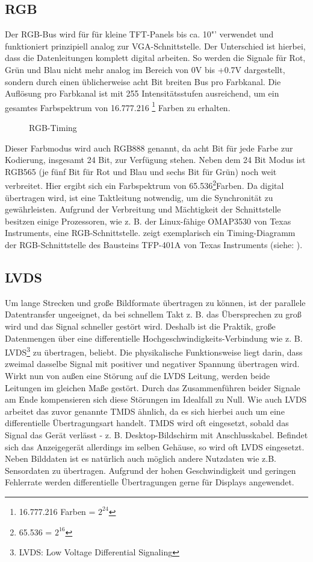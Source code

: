 \subsection{RGB}
Der RGB-Bus wird für für kleine TFT-Panels bis ca. 10"' verwendet und funktioniert prinzipiell analog zur VGA-Schnittstelle. Der Unterschied ist hierbei, dass die Datenleitungen komplett digital arbeiten. So werden die Signale für Rot, Grün und Blau nicht mehr analog im Bereich von 0V bis +0.7V dargestellt, sondern durch einen üblicherweise acht Bit breiten Bus pro Farbkanal. Die Auflösung pro Farbkanal ist mit 255 Intensitätsstufen ausreichend, um ein gesamtes Farbspektrum von 16.777.216 \footnote{16.777.216 Farben = $2^{24}$} Farben zu erhalten. 
\begin{figure}[htp]
	\centering
{}
	\caption{RGB-Timing}
	\label{fig:rgb_timing}
\end{figure}
Dieser Farbmodus wird auch RGB888 genannt, da acht Bit für jede Farbe zur Kodierung, insgesamt 24 Bit, zur Verfügung stehen. Neben dem 24 Bit Modus ist RGB565 (je fünf Bit für Rot und Blau und sechs Bit für Grün) noch weit verbreitet. Hier ergibt sich ein Farbspektrum von 65.536\footnote{65.536 = $2^{16}$}Farben. Da digital übertragen wird, ist eine Taktleitung notwendig, um die Synchronität zu gewährleisten. 
Aufgrund der Verbreitung und Mächtigkeit der Schnittstelle besitzen einige Prozessoren, wie z. B. der Linux-fähige OMAP3530 von Texas Instruments, eine RGB-Schnittstelle. 
 zeigt exemplarisch ein Timing-Diagramm der RGB-Schnittstelle des Bausteins TFP-401A von Texas Instruments (siehe: \cite{TI2011}).
\subsection{LVDS}
Um lange Strecken und große Bildformate übertragen zu können, ist der parallele Datentransfer ungeeignet, da bei schnellem Takt z. B. das Übersprechen zu groß wird und das Signal schneller gestört wird. Deshalb ist die Praktik, große Datenmengen über eine differentielle Hochgeschwindigkeits-Verbindung wie z. B. LVDS\footnote{LVDS: Low Voltage Differential Signaling} zu übertragen, beliebt. Die physikalische Funktionsweise liegt darin, dass zweimal dasselbe Signal mit positiver und negativer Spannung übertragen wird. Wirkt nun von außen eine Störung auf die LVDS Leitung, werden beide Leitungen im gleichen Maße gestört. Durch das Zusammenführen beider Signale am Ende kompensieren sich diese Störungen im Idealfall zu Null. Wie auch LVDS arbeitet das zuvor genannte TMDS ähnlich, da es sich hierbei auch um eine differentielle Übertragungsart handelt. TMDS wird oft eingesetzt, sobald das Signal das Gerät verlässt - z. B. Desktop-Bildschirm mit Anschlusskabel. Befindet sich das Anzeigegerät allerdings im selben Gehäuse, so wird oft LVDS eingesetzt. Neben Bilddaten ist es natürlich auch möglich andere Nutzdaten wie z.B. Sensordaten zu übertragen. 
Aufgrund der hohen Geschwindigkeit und geringen Fehlerrate werden differentielle Übertragungen gerne für Displays angewendet.
